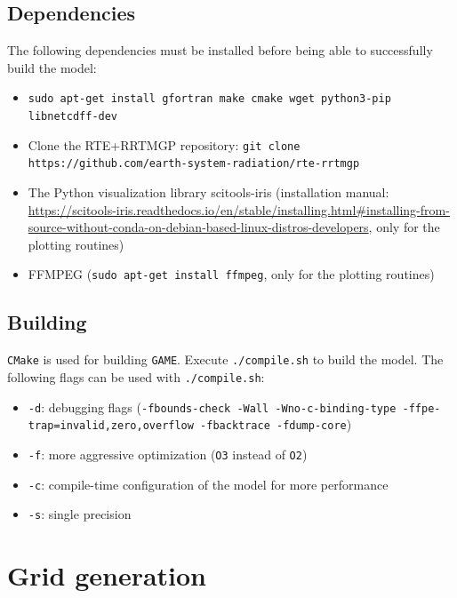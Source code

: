 \documentclass[10pt]{report}
\begin{document}
\section{Dependencies}
\label{sec:dependencies}

The following dependencies must be installed before being able to successfully build the model:

\begin{itemize}
\item \texttt{sudo apt-get install gfortran make cmake wget python3-pip libnetcdff-dev}
\item Clone the RTE+RRTMGP repository: \texttt{git clone https://github.com/earth-system-radiation/rte-rrtmgp}
\item The Python visualization library scitools-iris (installation manual: \url{https://scitools-iris.readthedocs.io/en/stable/installing.html#installing-from-source-without-conda-on-debian-based-linux-distros-developers}, only for the plotting routines)
\item FFMPEG (\texttt{sudo apt-get install ffmpeg}, only for the plotting routines)
\end{itemize}

\section{Building}
\label{sec:building}

\texttt{CMake} is used for building \texttt{GAME}. Execute \texttt{./compile.sh} to build the model. The following flags can be used with \texttt{./compile.sh}:
%
\begin{itemize}
\item \texttt{-d}: debugging flags (\texttt{-fbounds-check -Wall -Wno-c-binding-type -ffpe-trap=invalid,zero,overflow -fbacktrace -fdump-core})
\item \texttt{-f}: more aggressive optimization (\texttt{O3} instead of \texttt{O2})
\item \texttt{-c}: compile-time configuration of the model for more performance
\item \texttt{-s}: single precision
\end{itemize}

\chapter{Grid generation}
\label{chap:grid_generation}
\end{document}
